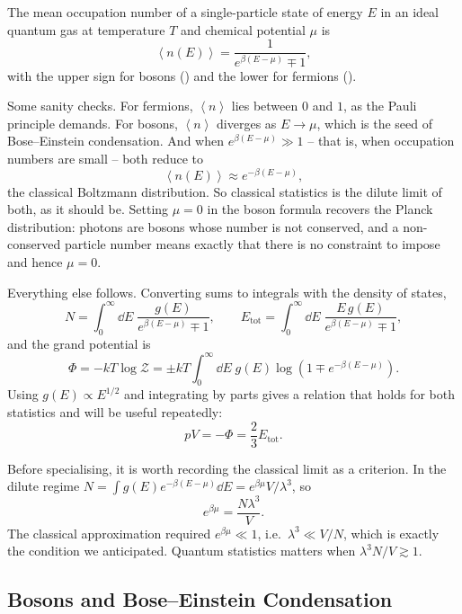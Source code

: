 \documentclass[a4paper]{scrartcl}
\newcommand{\avg}[1]{\left\langle #1 \right\rangle}
\begin{document}
\begin{proposition}
	The mean occupation number of a single-particle state of energy $E$ in an ideal quantum gas at temperature $T$ and chemical potential $\mu$ is
	$$
	\avg{n(E)} = \frac{1}{e^{\beta(E-\mu)}\mp 1},
	$$
	with the upper sign for bosons () and the lower for fermions ().
\end{proposition}

Some sanity checks. For fermions, $\avg n$ lies between $0$ and $1$, as the Pauli principle demands. For bosons, $\avg n$ diverges as $E \to \mu$, which is the seed of Bose--Einstein condensation. And when $e^{\beta(E-\mu)} \gg 1$ -- that is, when occupation numbers are small -- both reduce to
$$
\avg{n(E)} \approx e^{-\beta(E-\mu)},
$$
the classical Boltzmann distribution. So classical statistics is the dilute limit of both, as it should be. Setting $\mu = 0$ in the boson formula recovers the Planck distribution: photons are bosons whose number is not conserved, and a non-conserved particle number means exactly that there is no constraint to impose and hence $\mu = 0$.

Everything else follows. Converting sums to integrals with the density of states,
$$
N = \int_0^\infty \dd E\; \frac{g(E)}{e^{\beta(E-\mu)}\mp 1}, \qquad E_{\mathrm{tot}} = \int_0^\infty \dd E\; \frac{E\,g(E)}{e^{\beta(E-\mu)}\mp 1},
$$
and the grand potential is
$$
\Phi = -kT\log \mathcal Z = \pm kT \int_0^\infty \dd E\; g(E)\log\left(1 \mp e^{-\beta(E-\mu)}\right).
$$
Using $g(E) \propto E^{1/2}$ and integrating by parts gives a relation that holds for both statistics and will be useful repeatedly:
$$
pV = -\Phi = \frac 23 E_{\mathrm{tot}}.
$$

Before specialising, it is worth recording the classical limit as a criterion. In the dilute regime $N = \int g(E)e^{-\beta(E-\mu)}\dd E = e^{\beta\mu} V/\lambda^3$, so
$$
e^{\beta\mu} = \frac{N\lambda^3}{V}.
$$
The classical approximation required $e^{\beta\mu} \ll 1$, i.e.\ $\lambda^3 \ll V/N$, which is exactly the condition we anticipated. Quantum statistics matters when $\lambda^3 N/V \gtrsim 1$.

\subsection{Bosons and Bose--Einstein Condensation}\label{sec:bec}
\end{document}
